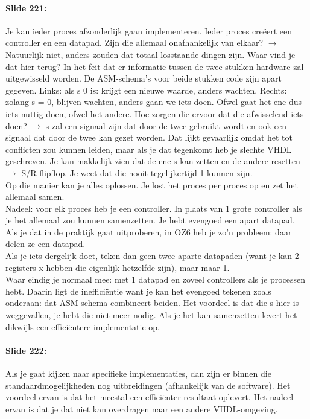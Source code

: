 \documentclass[10pt,a4paper]{book}
\begin{document}
\paragraph{Slide 221:} Je kan ieder proces afzonderlijk gaan implementeren. Ieder proces cre\"eert een controller en een datapad. Zijn die allemaal onafhankelijk van elkaar? $\rightarrow$ Natuurlijk niet, anders zouden dat totaal losstaande dingen zijn. Waar vind je dat hier terug? In het feit dat er informatie tussen de twee stukken hardware zal uitgewisseld worden. De ASM-schema's voor beide stukken code zijn apart gegeven. Links: als s 0 is: krijgt een nieuwe waarde, anders wachten. Rechts: zolang s = 0, blijven wachten, anders gaan we iets doen. Ofwel gaat het ene dus iets nuttig doen, ofwel het andere. Hoe zorgen die ervoor dat die afwisselend iets doen? $\rightarrow$ s zal een signaal zijn dat door de twee gebruikt wordt en ook een signaal dat door de twee kan gezet worden. Dat lijkt gevaarlijk omdat het tot conflicten zou kunnen leiden, maar als je dat tegenkomt heb je slechte VHDL geschreven. Je kan makkelijk zien dat de ene s kan zetten en de andere resetten $\rightarrow$ S/R-flipflop. Je weet dat die nooit tegelijkertijd 1 kunnen zijn.\\
Op die manier kan je alles oplossen. Je lost het proces per proces op en zet het allemaal samen.\\
Nadeel: voor elk proces heb je een controller. In plaats van 1 grote controller als je het allemaal zou kunnen samenzetten. Je hebt evengoed een apart datapad. Als je dat in de praktijk gaat uitproberen, in OZ6 heb je zo'n probleem: daar delen ze een datapad.\\
Als je iets dergelijk doet, teken dan geen twee aparte datapaden (want je kan 2 registers x hebben die eigenlijk hetzelfde zijn), maar maar 1.\\
Waar eindig je normaal mee: met 1 datapad en zoveel controllers als je processen hebt. Daarin ligt de ineffici\"entie want je kan het evengoed tekenen zoals onderaan: dat ASM-schema combineert beiden. Het voordeel is dat die s hier is weggevallen, je hebt die niet meer nodig. Als je het kan samenzetten levert het dikwijls een effici\"entere implementatie op.

\paragraph{Slide 222:} Als je gaat kijken naar specifieke implementaties, dan zijn er binnen die standaardmogelijkheden nog uitbreidingen (afhankelijk van de software). Het voordeel ervan is dat het meestal een effici\"enter resultaat oplevert. Het nadeel ervan is dat je dat niet kan overdragen naar een andere VHDL-omgeving.
\end{document}
